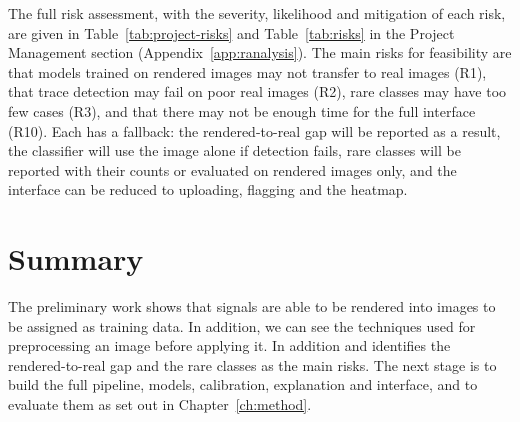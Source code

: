 The full risk assessment, with the severity, likelihood and mitigation of each risk, are given in Table~\ref{tab:project-risks} and Table~\ref{tab:risks} in the Project Management section (Appendix~\ref{app:ranalysis}). The main risks for feasibility are that models trained on rendered images may not transfer to real images (R1), that trace detection may fail on poor real images (R2), rare classes may have too few cases (R3), and that there may not be enough time for the full interface (R10). Each has a fallback: the rendered-to-real gap will be reported as a result, the classifier will use the image alone if detection fails, rare classes will be reported with their counts or evaluated on rendered images only, and the interface can be reduced to uploading, flagging and the heatmap. 

\section{Summary}

The preliminary work shows that signals are able to be rendered into images to be assigned as training data. In addition, we can see the techniques used for preprocessing an image before applying it. In addition and
identifies the rendered-to-real gap and the rare classes as the main risks. The next stage is
to build the full pipeline, models, calibration, explanation and interface, and to evaluate
them as set out in Chapter~\ref{ch:method}.